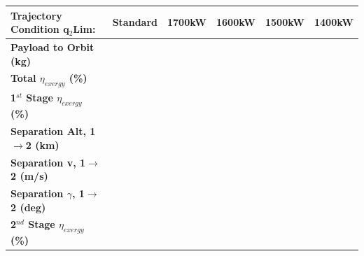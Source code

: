 \begin{table}[ht]
	
	\centering
	\begin{tabular}{l c c c c c } 
		\hline \textbf{Trajectory Condition}	q$_2$Lim:
		& Standard
		& 1700kW
		& 1600kW
		& 1500kW
		& 1400kW
		\\
		\hline \textbf{Payload to Orbit (kg)}
		& \textbf{\PayloadToOrbitheatLimStandard}
		& \textbf{\PayloadToOrbitheatLimSeventeenHundred}
		& \textbf{\PayloadToOrbitheatLimSixteenHundred}
		& \textbf{\PayloadToOrbitheatLimFifteenHundred}
		& \textbf{\PayloadToOrbitheatLimFourteenHundred}
		\\
		\textbf{Total $\eta_{exergy}$ (\%)}
		& \textbf{\totalExergyEffheatLimStandard}
		& \textbf{\totalExergyEffheatLimSeventeenHundred}
		& \textbf{\totalExergyEffheatLimSixteenHundred}
		& \textbf{\totalExergyEffheatLimFifteenHundred}
		& \textbf{\totalExergyEffheatLimFourteenHundred}
		\\
		\hline 
		\textbf{1$^{st}$ Stage $\eta_{exergy}$ (\%)}
		& \textbf{\firstExergyEffheatLimStandard}
		& \textbf{\firstExergyEffheatLimSeventeenHundred}
		& \textbf{\firstExergyEffheatLimSixteenHundred}
		& \textbf{\firstExergyEffheatLimFifteenHundred}
		& \textbf{\firstExergyEffheatLimFourteenHundred}
		\\
		\textbf{Separation Alt, 1$\rightarrow$2 (km)}
		& \firstsecondSeparationAltheatLimStandard
		& \firstsecondSeparationAltheatLimSeventeenHundred
		& \firstsecondSeparationAltheatLimSixteenHundred
		& \firstsecondSeparationAltheatLimFifteenHundred
		& \firstsecondSeparationAltheatLimFourteenHundred
		\\
		\textbf{Separation v, 1$\rightarrow$2 (m/s)}
		& \firstsecondSeparationvheatLimStandard
		& \firstsecondSeparationvheatLimSeventeenHundred
		& \firstsecondSeparationvheatLimSixteenHundred
		& \firstsecondSeparationvheatLimFifteenHundred
		& \firstsecondSeparationvheatLimFourteenHundred
		\\
		\textbf{Separation $\gamma$, 1$\rightarrow$2 (deg)}
		& \firstsecondSeparationgammaheatLimStandard
		& \firstsecondSeparationgammaheatLimSeventeenHundred
		& \firstsecondSeparationgammaheatLimSixteenHundred
		& \firstsecondSeparationgammaheatLimFifteenHundred
		& \firstsecondSeparationgammaheatLimFourteenHundred
		\\
		\hline 
		\textbf{2$^{nd}$ Stage $\eta_{exergy}$ (\%)}
		& \textbf{\secondExergyEffheatLimStandard}
		& \textbf{\secondExergyEffheatLimSeventeenHundred}
		& \textbf{\secondExergyEffheatLimSixteenHundred}
		& \textbf{\secondExergyEffheatLimFifteenHundred}

\end{tabular}
\end{table}
